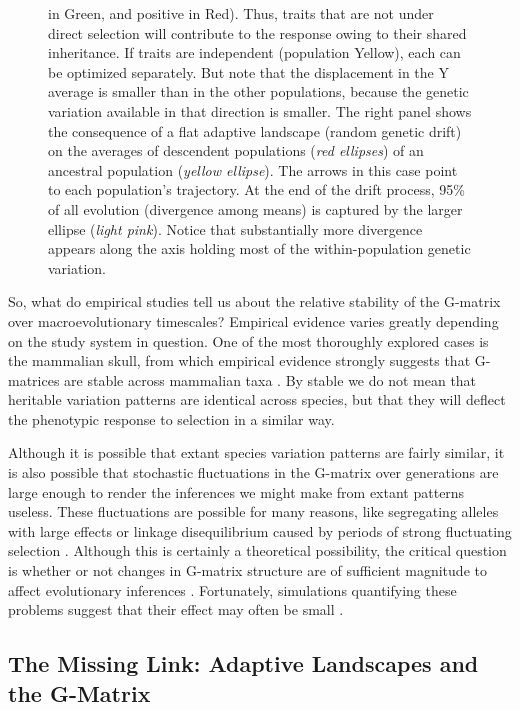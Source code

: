 \begin{refsection}
\begin{figure}
{in Green, and positive in Red). Thus, traits that are not under direct
selection will contribute to the response owing to their shared
inheritance. If traits are independent (population Yellow), each can be
optimized separately. But note that the displacement in the Y average is
smaller than in the other populations, because the genetic variation
available in that direction is smaller. The right panel shows the
consequence of a flat adaptive landscape (random genetic drift) on the
averages of descendent populations (\emph{red ellipses}) of an ancestral
population (\emph{yellow ellipse}). The arrows in this case point to
each population's trajectory. At the end of the drift process, 95\% of
all evolution (divergence among means) is captured by the larger ellipse
(\emph{light pink}). Notice that substantially more divergence appears
along the axis holding most of the within-population genetic variation.}
\label{aree:fig2}
\end{figure}

So, what do empirical studies tell us about the relative stability of
the G-matrix over macroevolutionary timescales? Empirical evidence
varies greatly depending on the study system in question. One of the
most thoroughly explored cases is the mammalian skull, from which
empirical evidence strongly suggests that G-matrices are stable across
mammalian taxa \parencite{Garcia2014-oj, Marroig2001-ne, Porto2009-pi}. By stable we do
not mean that heritable variation patterns are identical across species,
but that they will deflect the phenotypic response to selection in a
similar way.

Although it is possible that extant species variation patterns are
fairly similar, it is also possible that stochastic fluctuations in the
G-matrix over generations are large enough to render the inferences we
might make from extant patterns useless. These fluctuations are possible
for many reasons, like segregating alleles with large effects or linkage
disequilibrium caused by periods of strong fluctuating selection \parencite{Bulmer1971-aa, Turelli1988-io}. 
Although this is certainly a theoretical possibility, the critical question is whether or
not changes in G-matrix structure are of sufficient magnitude to affect
evolutionary inferences \parencite{Arnold2008-pc}. Fortunately, simulations quantifying these problems suggest
that their effect may often be small \parencite{Jones2012-aq, Jones2004-be}.

\subsection{The Missing Link: Adaptive Landscapes and the G-Matrix}


\end{refsection}
